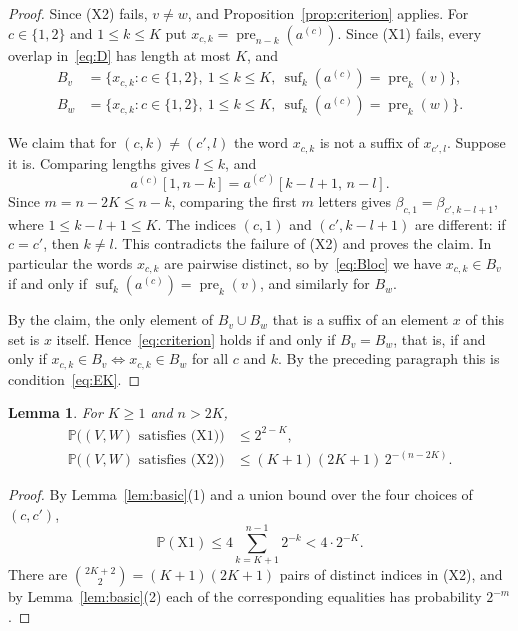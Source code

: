 \documentclass[11pt]{amsart}
\newtheorem{lemma}[theorem]{Lemma}
\theoremstyle{remark}
\numberwithin{equation}{section}
\newcommand{\pre}{\operatorname{pre}}
\newcommand{\suf}{\operatorname{suf}}
\newcommand{\PP}{\mathbb{P}}
\begin{document}
\begin{proof}
Since (X2) fails, $v\ne w$, and Proposition~\ref{prop:criterion} applies. For $c\in\{1,2\}$ and $1\le k\le K$ put $x_{c,k}=\pre_{n-k}(a^{(c)})$. Since (X1) fails, every overlap in~\eqref{eq:D} has length at most $K$, and
\begin{equation}\label{eq:Bloc}
  \begin{aligned}
  B_v&=\{x_{c,k}: c\in\{1,2\},\ 1\le k\le K,\ \suf_k(a^{(c)})=\pre_k(v)\},\\
  B_w&=\{x_{c,k}: c\in\{1,2\},\ 1\le k\le K,\ \suf_k(a^{(c)})=\pre_k(w)\}.
  \end{aligned}
\end{equation}

We claim that for $(c,k)\ne(c',l)$ the word $x_{c,k}$ is not a suffix of $x_{c',l}$. Suppose it is. Comparing lengths gives $l\le k$, and
\[
  a^{(c)}[1,n-k]=a^{(c')}[k-l+1,\,n-l].
\]
Since $m=n-2K\le n-k$, comparing the first $m$ letters gives $\beta_{c,1}=\beta_{c',k-l+1}$, where $1\le k-l+1\le K$. The indices $(c,1)$ and $(c',k-l+1)$ are different: if $c=c'$, then $k\ne l$. This contradicts the failure of (X2) and proves the claim. In particular the words $x_{c,k}$ are pairwise distinct, so by~\eqref{eq:Bloc} we have $x_{c,k}\in B_v$ if and only if $\suf_k(a^{(c)})=\pre_k(v)$, and similarly for $B_w$.

By the claim, the only element of $B_v\cup B_w$ that is a suffix of an element $x$ of this set is $x$ itself. Hence~\eqref{eq:criterion} holds if and only if $B_v=B_w$, that is, if and only if $x_{c,k}\in B_v\Leftrightarrow x_{c,k}\in B_w$ for all $c$ and $k$. By the preceding paragraph this is condition~\eqref{eq:EK}.
\end{proof}

\begin{lemma}\label{lem:exc}
For $K\ge1$ and $n>2K$,
\begin{align*}
  \PP\bigl((V,W)\text{ satisfies (X1)}\bigr)&\le 2^{2-K},\\
  \PP\bigl((V,W)\text{ satisfies (X2)}\bigr)&\le (K+1)(2K+1)\,2^{-(n-2K)} .
\end{align*}
\end{lemma}

\begin{proof}
By Lemma~\ref{lem:basic}(1) and a union bound over the four choices of $(c,c')$,
\[
  \PP(\mathrm{X1})\le 4\sum_{k=K+1}^{n-1}2^{-k}<4\cdot2^{-K}.
\]
There are $\binom{2K+2}{2}=(K+1)(2K+1)$ pairs of distinct indices in (X2), and by Lemma~\ref{lem:basic}(2) each of the corresponding equalities has probability $2^{-m}$.
\end{proof}
\end{document}
